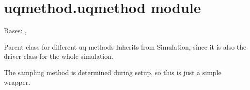 \documentclass[letterpaper,10pt,english]{sphinxmanual}
\begin{document}
\section{uqmethod.uqmethod module}
\label{\detokenize{uqmethod:module-uqmethod.uqmethod}}\label{\detokenize{uqmethod:uqmethod-uqmethod-module}}

\begin{fulllineitems}
\label{\detokenize{uqmethod:uqmethod.uqmethod.UqMethod}}
Bases: {\hyperref[\detokenize{simulation:simulation.simulation.Simulation}]{}}, {\hyperref[\detokenize{helpers:helpers.baseclass.BaseClass}]{}}

Parent class for different uq methods
Inherits from Simulation, since it is also the driver class for 
the whole simulation.

\begin{fulllineitems}
\label{\detokenize{uqmethod:uqmethod.uqmethod.UqMethod.default_yml}}
\end{fulllineitems}


\begin{fulllineitems}
\label{\detokenize{uqmethod:uqmethod.uqmethod.UqMethod.get_samples}}
The sampling method is determined during setup, so this is 
just a simple wrapper.

\end{fulllineitems}


\end{fulllineitems}
\end{document}
